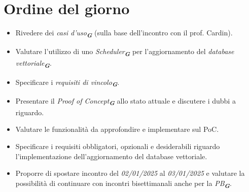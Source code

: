 

\section{Ordine del giorno}

\begin{itemize}
    \item Rivedere dei \emph{casi d'uso}\textsubscript{\textbf{\textit{G}}} (sulla base dell'incontro con il prof. Cardin).
    \item Valutare l'utilizzo di uno \emph{Scheduler}\textsubscript{\textbf{\textit{G}}} per l'aggiornamento del \emph{database vettoriale}\textsubscript{\textbf{\textit{G}}}.
    \item Specificare i \emph{requisiti di vincolo}\textsubscript{\textbf{\textit{G}}}.
    \item Presentare il \emph{Proof of Concept}\textsubscript{\textbf{\textit{G}}} allo stato attuale e discutere i dubbi a riguardo.
    \item Valutare le funzionalità da approfondire e implementare sul PoC.
    \item Specificare i requisiti obbligatori, opzionali e desiderabili riguardo l'implementazione dell'aggiornamento del database vettoriale.
    \item Proporre di spostare incontro del \emph{02/01/2025} al \emph{03/01/2025} e valutare la possibilità di continuare con incontri bisettimanali anche per la \emph{PB}\textsubscript{\textbf{\textit{G}}}.
\end{itemize}